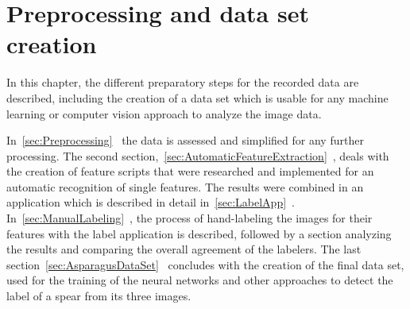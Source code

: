 \section{Preprocessing and data set creation}
\label{ch:Dataset}

In this chapter, the different preparatory steps for the recorded data are described, including the creation of a data set which is usable for any machine learning or computer vision approach to analyze the image data.

In~\ref{sec:Preprocessing}~ the data is assessed and simplified for any further processing. The second section,~\ref{sec:AutomaticFeatureExtraction}~, deals with the creation of feature scripts that were researched and implemented for an automatic recognition of single features.
The results were combined in an application which is described in detail in~\ref{sec:LabelApp}~. In~\ref{sec:ManualLabeling}~, the process of hand-labeling the images for their features with the label application is described, followed by a section analyzing the results and comparing the overall agreement of the labelers. The last section~\ref{sec:AsparagusDataSet}~ concludes with the creation of the final data set, used for the training of the neural networks and other approaches to detect the label of a spear from its three images.

